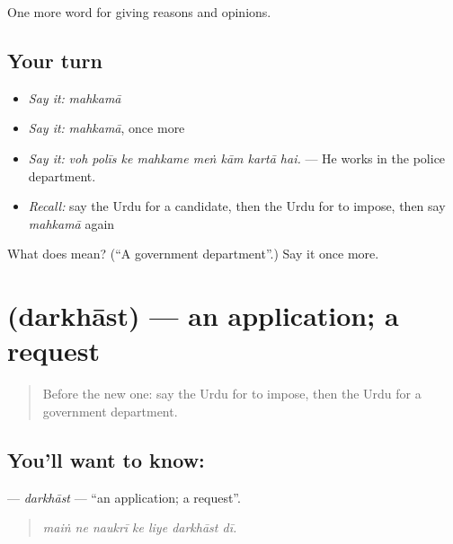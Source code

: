 \begin{grammarlens}[title={What you've built}]
One more word for giving reasons and opinions.
\end{grammarlens}

\subsection*{Your turn}
\begin{itemize}
\raggedright
  \item \emph{Say it:} \emph{mahkamā}
  \item \emph{Say it:} \emph{mahkamā}, once more
  \item \emph{Say it:} \emph{voh polīs ke mahkame meṅ kām kartā hai.} — He works in the police department.
  \item \emph{Recall:} say the Urdu for a candidate, then the Urdu for to impose, then say \emph{mahkamā} again
\end{itemize}

\begin{tcolorbox}[breakable,colback=teal!4,colframe=teal!35!black,title={Before you move on}]
What does  mean? (\textquotedblleft{}A government department\textquotedblright{}.) Say it once more.
\end{tcolorbox}
\section[\texorpdfstring{\ur{درخواست} (darkhāst)}{درخواست (darkhāst)}]{ (darkhāst) — an application; a request}

\label{lesson:UR-C343-darkhast}



\begin{quote}
Before the new one: say the Urdu for to impose, then the Urdu for a government department.
\end{quote}

\subsection*{You'll want to know: }
\textbf{} — \emph{darkhāst} — \textquotedblleft{}an application; a request\textquotedblright{}.

\begin{quote}
      
\end{quote}

\begin{quote}
\emph{maiṅ ne naukrī ke liye darkhāst dī.}
\end{quote}


